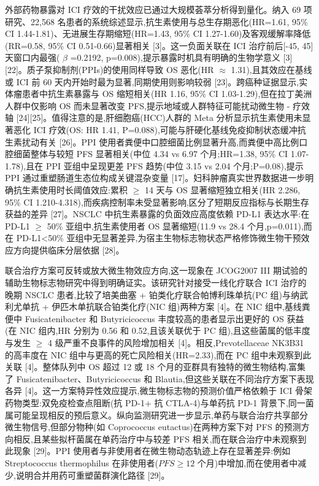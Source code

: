 外部药物暴露对 ICI 疗效的干扰效应已通过大规模荟萃分析得到量化。纳入 69 项研究、22,568 名患者的系统综述显示,抗生素使用与总生存期恶化(HR=1.61, 95\% CI 1.44-1.81)、无进展生存期缩短(HR=1.43, 95\% CI 1.27-1.60)及客观缓解率降低(RR=0.58, 95\% CI 0.51-0.66)显著相关 {[}3{]}。这一负面关联在 ICI 治疗前后{[}-45, 45{]} 天窗口内最强( \(\beta\) =0.2192, p=0.008),提示暴露时机具有明确的生物学意义 {[}3{]}{[}22{]}。质子泵抑制剂(PPIs)的使用同样导致 OS 恶化(HR \(\approx\) 1.31),且其效应在基线或 ICI 前 60 天内开始时最为显著,同期使用则影响较弱 {[}23{]}。跨癌种证据显示,实体瘤患者中抗生素暴露与 OS 缩短相关(HR 1.16, 95\% CI 1.03-1.29),但在拉丁美洲人群中仅影响 OS 而未显著改变 PFS,提示地域或人群特征可能扰动微生物 - 疗效轴 {[}24{]}{[}25{]}。值得注意的是,肝细胞癌(HCC)人群的 Meta 分析显示抗生素使用未显著恶化 ICI 疗效(OS: HR 1.41, P=0.088),可能与肝硬化基线免疫抑制状态缓冲抗生素扰动有关 {[}26{]}。PPI 使用者粪便中口腔细菌比例显著升高,而粪便中高比例口腔细菌整体与较短 PFS 显著相关(中位 4.34 vs 6.97 个月;HR=1.38, 95\% CI 1.07-1.78),且在 PPI 亚组中呈现更差 PFS 趋势(中位 3.15 vs 2.04 个月;P=0.08),提示 PPI 通过重塑肠道生态位构成关键混杂变量 {[}17{]}。妇科肿瘤真实世界数据进一步明确抗生素使用时长阈值效应:累积 \(\geq\) 14 天与 OS 显著缩短独立相关(HR 2.286, 95\% CI 1.210-4.318),而疾病控制率未受显著影响,区分了短期反应指标与长期生存获益的差异 {[}27{]}。NSCLC 中抗生素暴露的负面效应高度依赖 PD-L1 表达水平:在 PD-L1 \(\geq\) 50\% 亚组中,抗生素使用者 OS 显著缩短(11.9 vs 28.4 个月,p=0.011),而在 PD-L1\textless50\% 亚组中无显著差异,为宿主生物标志物状态严格修饰微生物干预效应方向提供临床分层依据 {[}28{]}。

联合治疗方案可反转或放大微生物效应方向,这一现象在 JCOG2007 III 期试验的辅助生物标志物研究中得到明确证实。该研究针对接受一线化疗联合 ICI 治疗的晚期 NSCLC 患者,比较了培美曲塞 + 铂类化疗联合帕博利珠单抗(PC 组)与纳武利尤单抗 + 伊匹木单抗联合铂类化疗(NIC 组)两种方案 {[}4{]}。在 NIC 组中,基线粪便中 Fusicatenibacter 和 Butyricicoccus 丰度较高的患者显示出更好的 OS 获益(在 NIC 组内,HR 分别为 0.56 和 0.52,且该关联优于 PC 组),且这些菌属的低丰度与发生 \(\geq\) 4 级严重不良事件的风险增加相关 {[}4{]}。相反,Prevotellaceae NK3B31 的高丰度在 NIC 组中与更高的死亡风险相关(HR=2.33),而在 PC 组中未观察到此关联 {[}4{]}。整体队列中 OS 超过 12 或 18 个月的亚群具有独特的微生物结构,富集了 Fusicatenibacter、Butyricicoccus 和 Blautia,但这些关联在不同治疗方案下表现各异 {[}4{]}。这一方案特异性效应提示,微生物标志物的预测价值严格依赖于 ICI 骨架药物类型:双免疫检查点阻断(抗 PD-1+ 抗 CTLA-4)与单药抗 PD-1 背景下,同一菌属可能呈现相反的预后意义。纵向监测研究进一步显示,单药与联合治疗共享部分微生物信号,但部分物种(如 Coprococcus eutactus)在两种方案下对 PFS 的预测方向相反,且某些拟杆菌属在单药治疗中与较差 PFS 相关,而在联合治疗中未观察到此现象 {[}29{]}。PPI 使用者与非使用者在微生物动态轨迹上存在显著差异:例如 Streptococcus thermophilus 在非使用者(\(PFS\geq12\) 个月)中增加,而在使用者中减少,说明合并用药可重塑菌群演化路径 {[}29{]}。

